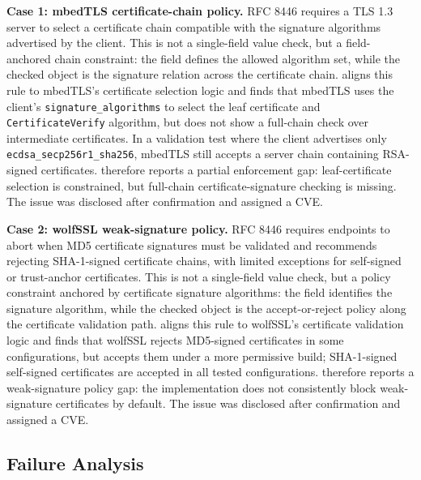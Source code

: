 \textbf{Case 1: mbedTLS certificate-chain policy.}
RFC 8446 requires a TLS 1.3 server to select a certificate chain compatible with
the signature algorithms advertised by the client. This is not a single-field
value check, but a field-anchored chain constraint: the field defines the
allowed algorithm set, while the checked object is the signature relation across
the certificate chain. \tool{} aligns this rule to mbedTLS's certificate
selection logic and finds that mbedTLS uses the client's
\texttt{signature\_algorithms} to select the leaf certificate and
\texttt{CertificateVerify} algorithm, but does not show a full-chain check over
intermediate certificates. In a validation test where the client advertises
only \texttt{ecdsa\_secp256r1\_sha256}, mbedTLS still accepts a server chain
containing RSA-signed certificates. \tool{} therefore reports a partial
enforcement gap: leaf-certificate selection is constrained, but full-chain
certificate-signature checking is missing. The issue was disclosed after
confirmation and assigned a CVE.

\textbf{Case 2: wolfSSL weak-signature policy.}
RFC 8446 requires endpoints to abort when MD5 certificate signatures must be
validated and recommends rejecting SHA-1-signed certificate chains, with limited
exceptions for self-signed or trust-anchor certificates. This is not a
single-field value check, but a policy constraint anchored by certificate
signature algorithms: the field identifies the signature algorithm, while the
checked object is the accept-or-reject policy along the certificate validation
path. \tool{} aligns this rule to wolfSSL's certificate validation logic and
finds that wolfSSL rejects MD5-signed certificates in some configurations, but
accepts them under a more permissive build; SHA-1-signed self-signed
certificates are accepted in all tested configurations. \tool{} therefore
reports a weak-signature policy gap: the implementation does not consistently
block weak-signature certificates by default. The issue was disclosed after
confirmation and assigned a CVE.

\subsection{Failure Analysis}


